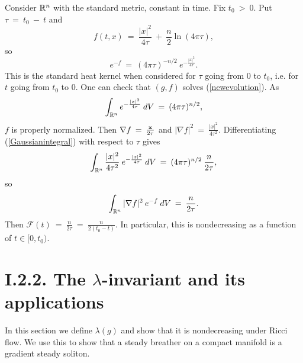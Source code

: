 Consider ${\mathbb R}^n$ with the standard metric, constant in time.
Fix $t_0 \: > \: 0$. Put $\tau \: = \: t_0 \: - \: t$ and
\begin{equation}
f(t, x) \: = \: \frac{|x|^2}{4\tau} \: + \: \frac{n}{2} \ln(4 \pi \tau),
\end{equation}
so
\begin{equation}
e^{-f} \: = \: (4 \pi \tau)^{-n/2} \: e^{- \frac{|x|^2}{4\tau}}.
\end{equation}
This is the standard heat kernel when considered for $\tau$ going from
$0$ to $t_0$, i.e. for $t$ going from $t_0$ to $0$.
One can check that $(g,f)$ solves (\ref{newevolution}).
As
\begin{equation} \label{Gaussianintegral}
\int_{{\mathbb R}^n} e^{- \frac{|x|^2}{4\tau}} \: dV \: = \: (4 \pi \tau)^{n/2},
\end{equation}
$f$ is properly normalized.
Then $\nabla f \: = \: \frac{{\bf x}}{2 \tau}$ and
$|\nabla f|^2 \: = \: \frac{|x|^2}{4 \tau^2}$.
Differentiating (\ref{Gaussianintegral}) with respect to $\tau$ gives
\begin{equation} \label{Gaussianintegral2}
\int_{{\mathbb R}^n} \frac{|x|^2}{4\tau^2} \:
e^{- \frac{|x|^2}{4\tau}} \: dV \: = \: (4 \pi \tau)^{n/2} \:
\frac{n}{2\tau},
\end{equation}
so
\begin{equation}
\int_{{\mathbb R}^n} |\nabla f|^2 \: e^{- f} \: dV \: = \: \frac{n}{2\tau}.
\end{equation}
Then ${\mathcal F}(t) \: = \: \frac{n}{2\tau} \: = \: \frac{n}{2(t_0-t)}$.
In particular, this is nondecreasing as a function of
$t \in [0, t_0)$.

\section{I.2.2. The $\lambda$-invariant and its applications}
\label{I.2.2}

In this section we define $\lambda(g)$ and show that it is nondecreasing under
Ricci flow.  We use this to show that a steady breather on a compact manifold
is a gradient steady soliton.

